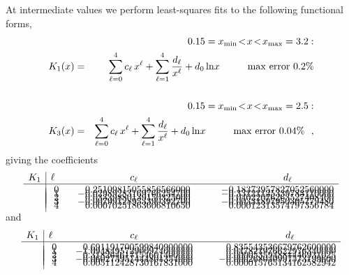 \documentclass[preprint,12pt,eqsecnum,nofootinbib,amsmath,amssymb]{revtex4}
\begin{document}
At intermediate values we perform least-squares fits
to the following functional forms, 
\begin{eqnarray}
\nonumber
  && \hskip-1.55cm 0.15=x_{\rm min} \!<\! x \!<\! x_{\rm max}=3.2 :
\\
  K_1(x) &=& 
  \sum_{\ell=0}^4 c_\ell\, x^\ell  +
  \sum_{\ell=1}^4 \frac{d_\ell}{x^\ell} + d_0\ln\!x
 \hskip1cm {\rm max~error}~ 0.2\%
\\[15pt]
\nonumber
  &&\hskip-1.55cm 0.15=x_{\rm min} \!<\! x \!<\! x_{\rm max}=2.5 :
\\
  K_3(x) &=& 
  \sum_{\ell=0}^4 c_\ell\, x^\ell  +
  \sum_{\ell=1}^4 \frac{d_\ell}{x^\ell} + d_0\ln\!x
 \hskip1cm {\rm max~error}~ 0.04\% ~~ ,
\end{eqnarray}
giving the coefficients
\begin{eqnarray}
  \begin{array}{l|lrr}
 K_1  &\ell~~~~& \hfill c_\ell \hfill & \hskip3cm d_\ell \hskip1.5cm  \\ \hline
      &  ~0 &  0.25109815055856566000  & -0.18373957827052560000    \\[-8pt]
      &  ~1 & -0.02989283169766254700  & -0.33121125339783110000    \\[-8pt]
      &  ~2 &  0.03339880139150325000  &  0.04022076263527408400    \\[-8pt]
      &  ~3 & -0.00799128953390392700  & -0.00331897950305779480    \\[-8pt]
      &  ~4 &  0.00070251863606810650  &  0.00012313574797356784    \\[-8pt]
 \end{array}
\end{eqnarray}
and
\begin{eqnarray}
  \begin{array}{l|lrr}
 K_1  &   \ell~~~~ & \hfill c_\ell \hfill   & \hskip3cm d_\ell \hskip1.5cm \\ \hline
      &  ~0 &  0.691191700599840900000 &  0.835543536679762600000   \\[-8pt]
      &  ~1 & -1.094849572900974000000 &  0.047821976622976340000   \\[-8pt]
      &  ~2 &  0.318264617154601400000 &  0.000053594881446931025   \\[-8pt]
      &  ~3 & -0.060275957444801354000 & -0.000268040997573199600   \\[-8pt]
      &  ~4 &  0.005112428730167831000 &  0.000015765134162582942   \\[-8pt]
 \end{array}
\end{eqnarray}
\end{document}
